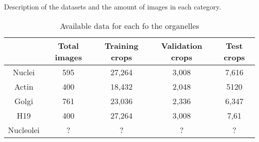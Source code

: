 Description of the datasets and the amount of images in each category.

\begin{table}[H]
    \centering
    \caption{Available data for each fo the organelles}
        \begin{adjustbox}{width=0.7\textwidth}
            \begin{tabular}{|c||c|c|c|c|}\hline
                &Total images
                &Training crops
                &Validation crops
                &Test crops
                \\\hline\hline
                Nuclei &595&27,264&3,008&7,616\\\hline
                Actin &400&18,432&2,048&5120\\\hline
                Golgi &761&23,036&2,336&6,347\\\hline
                H19 &400&27,264&3,008&7,61\\\hline
                Nucleolei &?&?&?&?\\\hline
            \end{tabular}
        \end{adjustbox}
\end{table}
